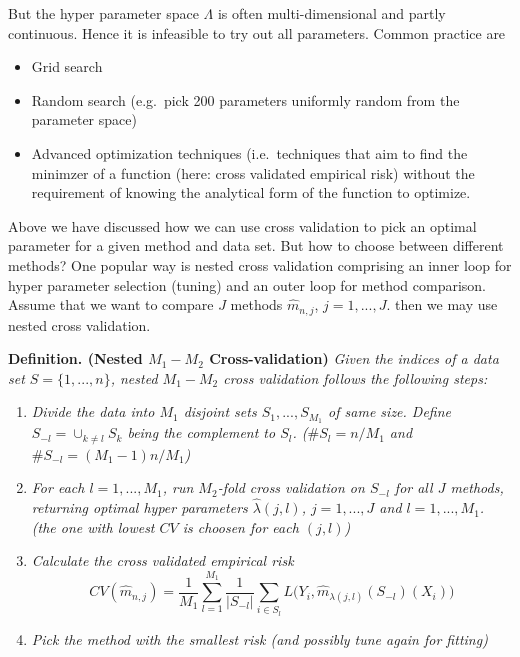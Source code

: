\documentclass[a4paper,10pt,openany]{book}
\providecommand{\tightlist}{%
 \setlength{\itemsep}{0pt}\setlength{\parskip}{0pt}}
\begin{document}
But the hyper parameter space \(\Lambda\) is often multi-dimensional and partly continuous. Hence it is infeasible to try out all parameters. Common practice are

\begin{itemize}
\tightlist
\item
  Grid search
\item
  Random search (e.g.~pick 200 parameters uniformly random from the parameter space)
\item
  Advanced optimization techniques (i.e.~techniques that aim to find the minimzer of a function (here: cross validated empirical risk) without the requirement of knowing the analytical form of the function to optimize.
\end{itemize}

Above we have discussed how we can use cross validation to pick an optimal parameter for a given method and data set. But how to choose between different methods? One popular way is nested cross validation comprising an inner loop for hyper parameter selection (tuning) and an outer loop for method comparison. Assume that we want to compare \(J\) methods \(\hat{m}_{n,j}\), \(j=1,...,J\). then we may use nested cross validation.

\textbf{Definition. (Nested \(M_1-M_2\) Cross-validation)} \emph{Given the indices of a data set \(S=\{1,...,n\}\), nested \(M_1-M_2\) cross validation follows the following steps:}

\begin{enumerate}
\def\labelenumi{\arabic{enumi}.}
\tightlist
\item
  \emph{Divide the data into \(M_1\) disjoint sets \(S_1,...,S_{M_1}\) of same size. Define \(S_{-l}=\cup_{k\ne l}S_k\) being the complement to \(S_l\). (\(\#S_l=n/M_1\) and \(\#S_{-l}=(M_1-1)n/M_1\))}
\item
  \emph{For each \(l=1,...,M_1\), run \(M_2\)-fold cross validation on \(S_{-l}\) for all \(J\) methods, returning optimal hyper parameters \(\hat{\lambda}(j,l)\), \(j=1,...,J\) and \(l=1,...,M_1\). (the one with lowest \(CV\) is choosen for each \((j,l)\))}
\item
  \emph{Calculate the cross validated empirical risk}
  \[
    CV(\hat{m}_{n,j})=\frac{1}{M_1}\sum_{l=1}^{M_1}\frac{1}{\vert S_{-l}\vert}\sum_{i\in S_l}L\big(Y_i,\hat{m}_{\lambda(j,l)}(S_{-l})(X_i)\big)
    \]
\item
  \emph{Pick the method with the smallest risk (and possibly tune again for fitting)}
\end{enumerate}
\end{document}
